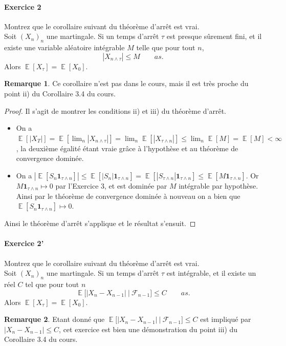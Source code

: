 \documentclass{article}
\theoremstyle{definition}
\newtheorem{rem}{Remarque}
\numberwithin{equation}{section}
\DeclareMathOperator{\E}{\mathbb{E}}
\begin{document}
\paragraph{Exercice 2} 
Montrez que le corollaire suivant du théorème d'arrêt est vrai.\\
Soit $(X_n)_n$ une martingale. Si un temps d'arrêt $\tau$ est presque sûrement fini, et il existe une variable aléatoire intégrable $M$ telle que pour tout $n$,
$$|X_{n\wedge \tau}|\leq M \qquad \textit{as}.$$
Alors $\E[X_\tau]=\E[X_0].$

\begin{rem}
Ce corollaire n'est pas dans le cours, mais il est très proche du point ii) du Corollaire 3.4 du cours.
\end{rem}

\begin{proof}
Il s'agit de montrer les conditions ii) et iii) du théorème d'arrêt.
\begin{itemize}
\item[ii)] On a $\E[|X_T|]=\E[\lim_n |X_{n\wedge \tau}|]= \lim_n \E[|X_{\tau\wedge n}|]\leq \lim_n \E[M]=\E[M]<\infty$, la deuxième égalité étant vraie grâce à l'hypothèse et au théorème de convergence dominée.
\item[iii)] On a $|\E[S_n \mathbf{1}_{\tau\wedge n}]|\leq \E[|S_n| \mathbf{1}_{\tau\wedge n}] = \E[|S_{\tau\wedge n}| \mathbf{1}_{\tau\wedge n}] \leq \E[M\mathbf{1}_{\tau\wedge n}]$. Or $M\mathbf{1}_{\tau\wedge n} \mapsto 0$ par l'Exercice 3, et est dominée par $M$ intégrable par hypothèse. Ainsi par le théorème de convergence dominée à nouveau on a bien que $\E[S_n \mathbf{1}_{\tau\wedge n}] \mapsto 0$.
\end{itemize}
Ainsi le théorème d'arrêt s'applique et le résultat s'ensuit.
\end{proof}



\paragraph{Exercice 2'} 
Montrez que le corollaire suivant du théorème d'arrêt est vrai.\\
Soit $(X_n)_n$ une martingale. Si un temps d'arrêt $\tau$ est intégrable, et il existe un réel $C$ tel que pour tout $n$
$$\E\big[|X_n-X_{n-1}|~\big|~\mathcal{F}_{n-1}\big]\leq C \qquad \textit{as}.$$
Alors $\E[X_\tau]=\E[X_0].$

\begin{rem}
Etant donné que $\E\big[|X_n-X_{n-1}|~\big|~\mathcal{F}_{n-1}\big]\leq C$ est impliqué par $|X_n-X_{n-1}|\leq C$, cet exercice est bien une démonstration du point iii) du Corollaire 3.4 du cours.
\end{rem}
\end{document}
